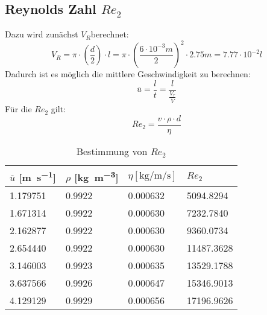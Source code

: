 \documentclass[12pt]{article}
\begin{document}
\subsection{Reynolds Zahl $Re _2$}
Dazu wird zunächst $V _R$berechnet:
\begin{equation}
  V _R = \pi \cdot (\frac{d}{2}) \cdot l = \pi \cdot (\frac{6 \cdot 10^{-3} m}{2})^2 \cdot 2.75 m = 7.77 \cdot 10 ^{-2} l
\end{equation}
Dadurch ist es möglich die mittlere Geschwindigkeit zu berechnen:
\begin{equation}
  \overline{u} = \frac{l}{t} = \frac{l}{\frac{V_r}{\dot V}}
\end{equation}
Für die $Re_2$ gilt:
\begin{equation}
  Re _2 = \frac{v \cdot \rho \cdot d}{\eta}
\end{equation}
 \begin{table}[ht!]
  \centering
 \begin{tabularx}{\textwidth}{XXXX}
 $\overline u$ [\si{\meter\per\second}]  &  $\rho$ [\si{\kilo\gram\per\cubic\meter}] &
 $ \eta [\si{\kilo\gram\per\meter\per\second}] $ & $Re _2 $  \\
\hline
\rowcolor{LightCyan}
1.179751 & 0.9922 & 0.000632 &5094.8294 \\
1.671314 & 0.9922 & 0.000630 &7232.7840 \\
\rowcolor{LightCyan}
2.162877 & 0.9922 & 0.000630 &9360.0734 \\
2.654440 & 0.9922 & 0.000630 &11487.3628\\
\rowcolor{LightCyan}
3.146003 & 0.9923 & 0.000635 &13529.1788\\
3.637566 & 0.9926 & 0.000647 &15346.9013\\
\rowcolor{LightCyan}
4.129129 & 0.9929 & 0.000656 &17196.9626\\
\end{tabularx}
  \caption{Bestimmung von $Re _2$}
\end{table}
\end{document}
